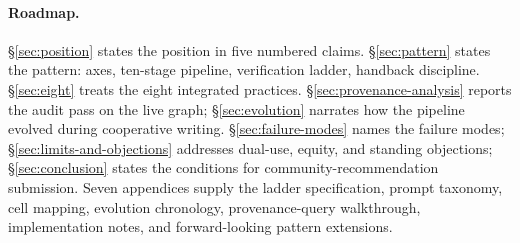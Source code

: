 \paragraph{Roadmap.}
\S\ref{sec:position} states the position in five numbered claims.
\S\ref{sec:pattern} states the pattern: axes, ten-stage pipeline,
verification ladder, handback discipline. \S\ref{sec:eight}
treats the eight integrated practices.
\S\ref{sec:provenance-analysis} reports the audit pass on the live
graph; \S\ref{sec:evolution} narrates how the pipeline evolved
during cooperative writing. \S\ref{sec:failure-modes} names the
failure modes; \S\ref{sec:limits-and-objections} addresses
dual-use, equity, and standing objections;
\S\ref{sec:conclusion} states the conditions for
community-recommendation submission. Seven appendices supply the
ladder specification, prompt taxonomy, cell mapping, evolution
chronology, provenance-query walkthrough, implementation notes,
and forward-looking pattern extensions.

